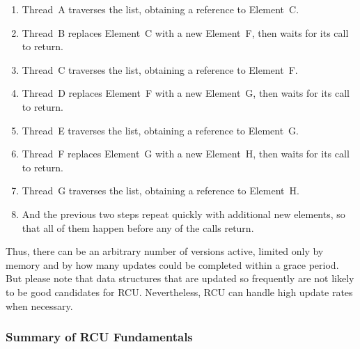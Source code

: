 {{	\begin{enumerate}
	\item	Thread~A traverses the list, obtaining a reference to
		Element~C.
	\item	Thread~B replaces Element~C with a new
		Element~F, then waits for its 
		call to return.
	\item	Thread~C traverses the list, obtaining a reference to
		Element~F.
	\item	Thread~D replaces Element~F with a new
		Element~G, then waits for its 
		call to return.
	\item	Thread~E traverses the list, obtaining a reference to
		Element~G.
	\item	Thread~F replaces Element~G with a new
		Element~H, then waits for its 
		call to return.
	\item	Thread~G traverses the list, obtaining a reference to
		Element~H.
	\item	And the previous two steps repeat quickly with additional
		new elements, so that all of them happen before any of
		the  calls return.
	\end{enumerate}

	Thus, there can be an arbitrary number of versions active,
	limited only by memory and by how many updates could be completed
	within a grace period.
	But please note that data structures that are updated so frequently
	are not likely to be good candidates for RCU\@.
	Nevertheless, RCU can handle high update rates when necessary.
}\QuickQuizEndM
%
\QuickQuizEndE
}

\subsubsection{Summary of RCU Fundamentals}
\label{sec:defer:Summary of RCU Fundamentals}


